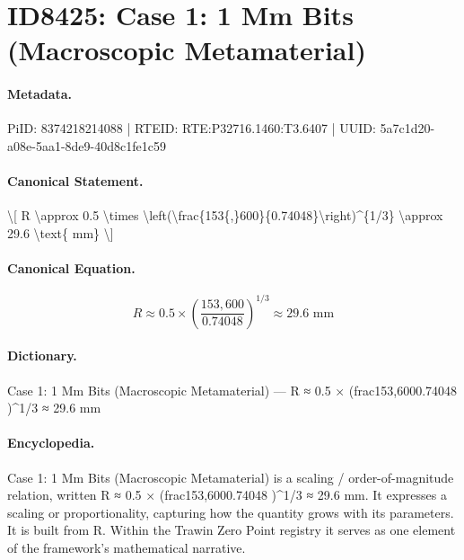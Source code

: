 \section*{ID8425: Case 1: 1 Mm Bits (Macroscopic Metamaterial)}
\paragraph{Metadata.}
PiID: 8374218214088 | RTEID: RTE:P32716.1460:T3.6407 | UUID: 5a7c1d20-a08e-5aa1-8de9-40d8c1fe1c59

\paragraph{Canonical Statement.}
\textbackslash{}[ R \textbackslash{}approx 0.5 \textbackslash{}times \textbackslash{}left(\textbackslash{}frac\{153\{,\}600\}\{0.74048\}\textbackslash{}right)\textasciicircum{}\{1/3\} \textbackslash{}approx 29.6 \textbackslash{}text\{ mm\} \textbackslash{}]

\paragraph{Canonical Equation.}
\[
R \approx 0.5 \times \left(\frac{153{,}600}{0.74048}\right)^{1/3} \approx 29.6 \text{ mm}
\]

\paragraph{Dictionary.}
Case 1: 1 Mm Bits (Macroscopic Metamaterial) — R ≈ 0.5 × (frac153,6000.74048 )\textasciicircum{}1/3 ≈ 29.6 mm

\paragraph{Encyclopedia.}
Case 1: 1 Mm Bits (Macroscopic Metamaterial) is a scaling / order-of-magnitude relation, written R ≈ 0.5 × (frac153,6000.74048 )\textasciicircum{}1/3 ≈ 29.6 mm. It expresses a scaling or proportionality, capturing how the quantity grows with its parameters. It is built from R. Within the Trawin Zero Point registry it serves as one element of the framework's mathematical narrative.
